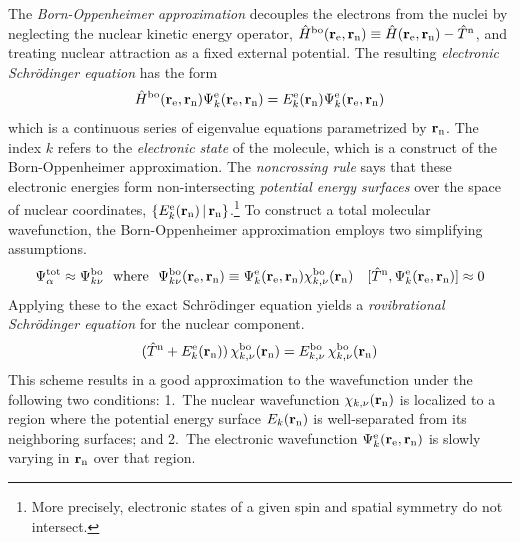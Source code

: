 \documentclass[11pt]{article}
\begin{document}
\begin{dfn}
The \textit{Born-Oppenheimer approximation} decouples the electrons from the nuclei by neglecting the nuclear kinetic energy operator,
$
  \hat{H}^{\mathrm{bo}}(\mathbf{r}_{\mathrm{e}},\mathbf{r}_{\mathrm{n}})
\equiv
  \hat{H}(\mathbf{r}_{\mathrm{e}},\mathbf{r}_{\mathrm{n}})
-
  \hat{T}^{\mathrm{n}}
$,
and treating nuclear attraction as a fixed external potential.
The resulting \textit{electronic Schr\"odinger equation} has the form
\begin{align}
\label{eq:born-oppenheimer-equation}
  \hat{H}^{\mathrm{bo}}(\mathbf{r}_{\mathrm{e}},\mathbf{r}_{\mathrm{n}})
  \Psi _k^{\mathrm{e}}(\mathbf{r}_{\mathrm{e}},\mathbf{r}_{\mathrm{n}})
=
  E_k^{\mathrm{e}}(\mathbf{r}_{\mathrm{n}})
  \Psi _k^{\mathrm{e}}(\mathbf{r}_{\mathrm{e}},\mathbf{r}_{\mathrm{n}})
\end{align}
which is a continuous series of eigenvalue equations parametrized by $\mathbf{r}_{\mathrm{n}}$.
The index $k$ refers to the \textit{electronic state} of the molecule, which is a construct of the Born-Oppenheimer approximation.
The \textit{noncrossing rule} says that these electronic energies form non-intersecting \textit{potential energy surfaces} over the space of nuclear coordinates, $\{E_k^{\mathrm{e}}(\mathbf{r}_{\mathrm{n}})\,|\,\mathbf{r}_{\mathrm{n}}\}$.\footnote{
  More precisely, electronic states of a given spin and spatial symmetry do not intersect.
}
To construct a total molecular wavefunction, the Born-Oppenheimer approximation employs two simplifying assumptions.
\begin{align}
\label{eq:born-oppenheimer-approximations}
  \Y_\a^\mr{tot}
\approx
  \Y_{k\nu}^\mr{bo}
\ \ \text{where} \ \ 
  \Y_{k\nu}^\mr{bo}(\bo{r}_\mr{e},\bo{r}_\mr{n})
\equiv
  \Y_k^\mr{e}(\bo{r}_\mr{e},\bo{r}_\mr{n})
  \x_{k,\nu}^\mr{bo}(\bo{r}_\mr{n})
&&
  [\op{T}^\mr{n}, \Y_k^\mr{e}(\bo{r}_\mr{e},\bo{r}_\mr{n})]
\approx
  0
\end{align}
Applying these to the exact Schr\"odinger equation yields a \textit{rovibrational Schr\"odinger equation} for the nuclear component.
\begin{align}
\label{eq:born-oppeheimer-nuclear-motion-equation}
  (
    \op{T}^\mr{n}
  +
    E_k^\mr{e}(\bo{r}_\mr{n})
  )\,
  \x_{k,\nu}^\mr{bo}(\bo{r}_\mr{n})
=
  E_{k,\nu}^\mr{bo}\,
  \x_{k,\nu}^\mr{bo}(\bo{r}_\mr{n})
\end{align}
This scheme results in a good approximation to the wavefunction under the following two conditions:
1.~The nuclear wavefunction $\x_{k,\nu}(\bo{r}_\mr{n})$ is localized to a region where the potential energy surface $E_k(\mathbf{r}_{\mathrm{n}})$ is well-separated from its neighboring surfaces;
and 2.~The electronic wavefunction $\Psi _k^{\mathrm{e}}(\mathbf{r}_{\mathrm{e}},\mathbf{r}_{\mathrm{n}})$ is slowly varying in $\mathbf{r}_{\mathrm{n}}$ over that region.
\end{dfn}
\end{document}
